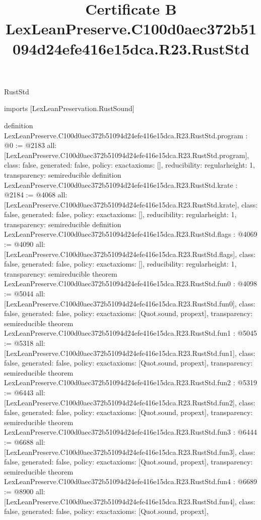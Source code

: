 \begin{lexlean}{RustStd}
\title{Certificate B LexLeanPreserve.C100d0aec372b51094d24efe416e15dca.R23.RustStd}
\begin{coremodule}
imports [LexLeanPreservation.RustSound]

definition LexLeanPreserve.C100d0aec372b51094d24efe416e15dca.R23.RustStd.program : @0 := @2183 {
  all: [LexLeanPreserve.C100d0aec372b51094d24efe416e15dca.R23.RustStd.program],
  class: false,
  generated: false,
  policy: exact{axioms: []},
  reducibility: regular{height: 1},
  transparency: semireducible
}
definition LexLeanPreserve.C100d0aec372b51094d24efe416e15dca.R23.RustStd.krate : @2184 := @4068 {
  all: [LexLeanPreserve.C100d0aec372b51094d24efe416e15dca.R23.RustStd.krate],
  class: false,
  generated: false,
  policy: exact{axioms: []},
  reducibility: regular{height: 1},
  transparency: semireducible
}
definition LexLeanPreserve.C100d0aec372b51094d24efe416e15dca.R23.RustStd.flags : @4069 := @4090 {
  all: [LexLeanPreserve.C100d0aec372b51094d24efe416e15dca.R23.RustStd.flags],
  class: false,
  generated: false,
  policy: exact{axioms: []},
  reducibility: regular{height: 1},
  transparency: semireducible
}
theorem LexLeanPreserve.C100d0aec372b51094d24efe416e15dca.R23.RustStd.fun0 : @4098 := @5044 {
  all: [LexLeanPreserve.C100d0aec372b51094d24efe416e15dca.R23.RustStd.fun0],
  class: false,
  generated: false,
  policy: exact{axioms: [Quot.sound, propext]},
  transparency: semireducible
}
theorem LexLeanPreserve.C100d0aec372b51094d24efe416e15dca.R23.RustStd.fun1 : @5045 := @5318 {
  all: [LexLeanPreserve.C100d0aec372b51094d24efe416e15dca.R23.RustStd.fun1],
  class: false,
  generated: false,
  policy: exact{axioms: [Quot.sound, propext]},
  transparency: semireducible
}
theorem LexLeanPreserve.C100d0aec372b51094d24efe416e15dca.R23.RustStd.fun2 : @5319 := @6443 {
  all: [LexLeanPreserve.C100d0aec372b51094d24efe416e15dca.R23.RustStd.fun2],
  class: false,
  generated: false,
  policy: exact{axioms: [Quot.sound, propext]},
  transparency: semireducible
}
theorem LexLeanPreserve.C100d0aec372b51094d24efe416e15dca.R23.RustStd.fun3 : @6444 := @6688 {
  all: [LexLeanPreserve.C100d0aec372b51094d24efe416e15dca.R23.RustStd.fun3],
  class: false,
  generated: false,
  policy: exact{axioms: [Quot.sound, propext]},
  transparency: semireducible
}
theorem LexLeanPreserve.C100d0aec372b51094d24efe416e15dca.R23.RustStd.fun4 : @6689 := @8900 {
  all: [LexLeanPreserve.C100d0aec372b51094d24efe416e15dca.R23.RustStd.fun4],
  class: false,
  generated: false,
  policy: exact{axioms: [Quot.sound, propext]},
}
\end{coremodule}
\end{lexlean}
